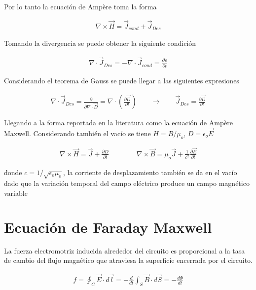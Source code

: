 Por lo tanto la ecuación de Ampère toma la forma

\begin{eqnarray}
    \nabla \times \vec{H} = \vec{J}_{cond} + \vec{J}_{Des}
\end{eqnarray}

Tomando la divergencia se puede obtener la siguiente condición 

\begin{eqnarray}
    \nabla \cdot \vec{J}_{Des} = -\nabla \cdot \vec{J}_{cond} = \frac{\partial \rho}{\partial t}
\end{eqnarray}

Considerando el teorema de Gauss \cite{Arfken} se puede llegar a las siguientes expresiones

\begin{eqnarray}
    \nabla\cdot\vec{J}_{Des} = \frac{\partial }{\partial \nabla \cdot \vec{D}} = \nabla\cdot\left(\frac{\partial\vec{D}}{\partial t}\right) \qquad \longrightarrow \qquad \vec{J}_{Des} = \frac{\partial \vec{D}}{\partial t}
\end{eqnarray}


Llegando a la forma reportada en la literatura como la ecuación de Ampère Maxwell. Considerando también el vacío se tiene $H = B/\mu_{o}$, $D = \epsilon_{o}\vec{E}$ 

\begin{eqnarray}
\label{Ampere}
    \boxed{\nabla \times \vec{H} = \vec{J} + \frac{\partial D}{\partial t}} \qquad \qquad \boxed{\nabla \times \vec{B} = \mu_{o}\vec{J} + \frac{1}{c^{2}}\frac{\partial \vec{E}}{\partial t}}
\end{eqnarray}

donde $c =1/\sqrt{\epsilon_{o}\mu_{o}}$, la corriente de desplazamiento también se da en el vacío dado que la variación temporal del campo eléctrico produce un campo magnético variable 

\section{Ecuación de Faraday Maxwell}

La fuerza electromotriz inducida alrededor del circuito es proporcional a la tasa de cambio del flujo magnético que atraviesa la superficie encerrada por el circuito.  \cite{Lacava}

\begin{eqnarray}
\label{Faraday}
    f = \oint_{C} \vec{E}\cdot d\vec{l} = -\frac{d }{dt}\int_{S}\vec{B}\cdot d\vec{S} = -\frac{ d\Phi}{dt}
\end{eqnarray}

